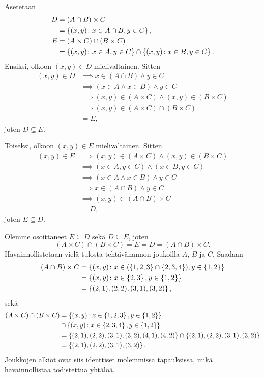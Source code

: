 \documentclass[12pt,a4paper]{article}
\begin{document}
\begin{solution}
Asetetaan
\[
\begin{aligned}
D &= (A \cap B) \times C \\
&= \left\lbrace(x, y) \colon x \in A \cap B, y \in C\right\rbrace, \\
E &= (A \times C) \cap (B \times C) \\
&= \left\lbrace(x, y) \colon x \in A, y \in C\right\rbrace \cap \left\lbrace(x, y) \colon x \in
B, y \in C\right\rbrace.
\end{aligned}
\]
Ensiksi, olkoon \((x, y) \in D\) mielivaltainen. Sitten
\[
\begin{aligned}
(x, y) \in D &\implies x \in (A \cap B) \land y \in C \\
&\implies (x \in A \land x \in B) \land y \in C \\
&\implies (x, y) \in (A \times C) \land (x, y) \in (B \times C) \\
&\implies (x, y) \in (A \times C) \cap (B \times C) \\
&= E,
\end{aligned}
\]
joten \(D \subseteq E\).

Toiseksi, olkoon \((x, y) \in E\) mielivaltainen. Sitten
\[
\begin{aligned}
(x, y) \in E &\implies (x, y) \in (A \times C) \land (x, y) \in (B \times C) \\
&\implies (x \in A, y \in C) \land (x \in B, y \in C) \\
&\implies (x \in A \land x \in B) \land y \in C \\
&\implies x \in (A \cap B) \land y \in C \\
&\implies (x, y) \in (A \cap B) \times C \\
&= D,
\end{aligned}
\]
joten \(E \subseteq D\).

Olemme osoittaneet \(E \subseteq D\) sekä \(D \subseteq E\), joten
\[
(A \times C) \cap (B \times C) = E = D = (A \cap B) \times C.
\]
Havainnollistetaan vielä tulosta tehtävänannon joukoilla \(A\), \(B\) ja \(C\).
Saadaan
\[
\begin{aligned}
(A \cap B) \times C &= \left\lbrace(x, y) \colon x \in (\left\lbrace1,2,3\right\rbrace \cap
\left\lbrace2,3,4\right\rbrace), y \in \left\lbrace1, 2\right\rbrace\right\rbrace \\
&= \left\lbrace(x, y) \colon x \in \left\lbrace2,3\right\rbrace, y \in \left\lbrace1, 2\right\rbrace\right\rbrace \\
&= \left\lbrace(2, 1), (2, 2), (3, 1), (3, 2)\right\rbrace,
\end{aligned}
\]
sekä
\[
\begin{aligned}
(A \times C) \cap (B \times C) &= \left\lbrace(x, y) \colon x \in
\left\lbrace1,2,3\right\rbrace, y \in \left\lbrace1,2\right\rbrace\right\rbrace \\
&\cap \left\lbrace(x, y) \colon x \in \left\lbrace2,3,4\right\rbrace, y \in \left\lbrace1,2\right\rbrace\right\rbrace \\
&= \left\lbrace(2,1),(2,2),(3,1),(3,2),(4,1),(4,2)\right\rbrace \cap \left\lbrace(2, 1), (2,
2), (3, 1), (3, 2)\right\rbrace \\
&= \left\lbrace(2,1),(2,2),(3,1),(3,2)\right\rbrace.
\end{aligned}
\]
Joukkojen alkiot ovat siis identtiset molemmissa tapauksissa, mikä
havainnollistaa todistettua yhtälöä.
\end{solution}
\end{document}
